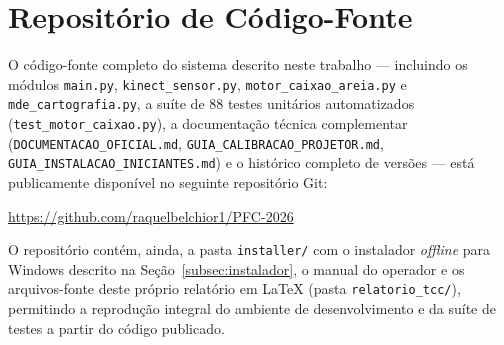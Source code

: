 
\chapter{Repositório de Código-Fonte}
\label{an:repositorio}

O código-fonte completo do sistema descrito neste trabalho — incluindo
os módulos \texttt{main.py}, \texttt{kinect\_sensor.py},
\texttt{motor\_caixao\_areia.py} e \texttt{mde\_cartografia.py}, a
suíte de 88 testes unitários automatizados
(\texttt{test\_motor\_caixao.py}), a documentação técnica complementar
(\texttt{DOCUMENTACAO\_OFICIAL.md}, \texttt{GUIA\_CALIBRACAO\_PROJETOR.md},
\texttt{GUIA\_INSTALACAO\_INICIANTES.md}) e o
histórico completo de versões — está publicamente disponível no
seguinte repositório Git:

\begin{center}
\url{https://github.com/raquelbelchior1/PFC-2026}
\end{center}

\noindent O repositório contém, ainda, a pasta \texttt{installer/} com
o instalador \textit{offline} para Windows descrito na
Seção~\ref{subsec:instalador}, o manual do operador e os arquivos-fonte
deste próprio relatório em \LaTeX{} (pasta \texttt{relatorio\_tcc/}),
permitindo a reprodução integral do ambiente de desenvolvimento e da
suíte de testes a partir do código publicado.
